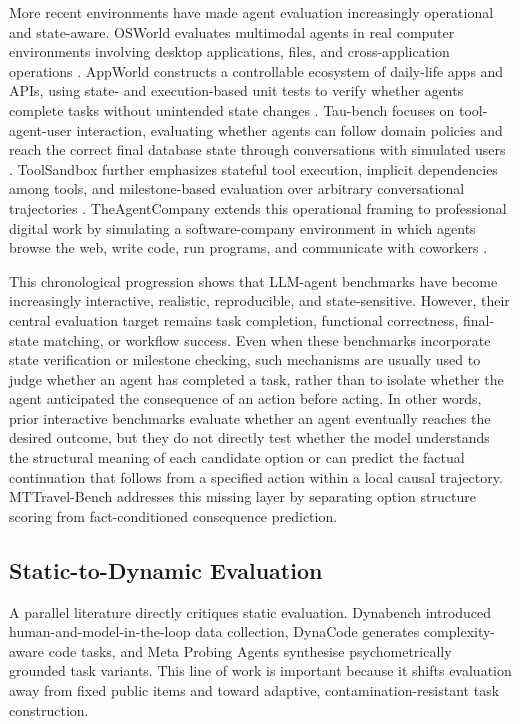\documentclass[pdflatex,sn-mathphys-num]{sn-jnl}%
\theoremstyle{thmstyleone}%
\theoremstyle{thmstyletwo}%
\theoremstyle{thmstylethree}%
\begin{document}
More recent environments have made agent evaluation increasingly operational and state-aware. OSWorld evaluates multimodal agents in real computer environments involving desktop applications, files, and cross-application operations \cite{xie2024osworld}. AppWorld constructs a controllable ecosystem of daily-life apps and APIs, using state- and execution-based unit tests to verify whether agents complete tasks without unintended state changes \cite{trivedi2024appworld}. Tau-bench focuses on tool-agent-user interaction, evaluating whether agents can follow domain policies and reach the correct final database state through conversations with simulated users \cite{yao2024bench}. ToolSandbox further emphasizes stateful tool execution, implicit dependencies among tools, and milestone-based evaluation over arbitrary conversational trajectories \cite{lu2024toolsandbox}. TheAgentCompany extends this operational framing to professional digital work by simulating a software-company environment in which agents browse the web, write code, run programs, and communicate with coworkers \cite{xu2024theagentcompany}.

This chronological progression shows that LLM-agent benchmarks have become increasingly interactive, realistic, reproducible, and state-sensitive. However, their central evaluation target remains task completion, functional correctness, final-state matching, or workflow success. Even when these benchmarks incorporate state verification or milestone checking, such mechanisms are usually used to judge whether an agent has completed a task, rather than to isolate whether the agent anticipated the consequence of an action before acting. In other words, prior interactive benchmarks evaluate whether an agent eventually reaches the desired outcome, but they do not directly test whether the model understands the structural meaning of each candidate option or can predict the factual continuation that follows from a specified action within a local causal trajectory. MTTravel-Bench addresses this missing layer by separating option structure scoring from fact-conditioned consequence prediction.

\subsection{Static-to-Dynamic Evaluation}
A parallel literature directly critiques static evaluation. Dynabench introduced human-and-model-in-the-loop data collection, DynaCode generates complexity-aware code tasks, and Meta Probing Agents synthesise psychometrically grounded task variants. This line of work is important because it shifts evaluation away from fixed public items and toward adaptive, contamination-resistant task construction.
\end{document}
